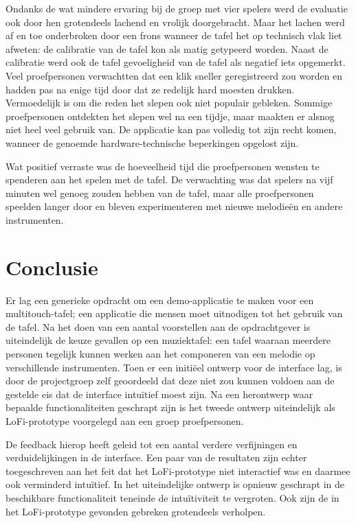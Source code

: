 \documentclass{acm}
\begin{document}
Ondanks de wat mindere ervaring bij de groep met vier spelers werd de evaluatie ook door hen grotendeels lachend en vrolijk doorgebracht. Maar het lachen werd af en toe onderbroken door een frons wanneer de tafel het op technisch vlak liet afweten: de calibratie van de tafel kon als matig getypeerd worden. Naast de calibratie werd ook de tafel gevoeligheid van de tafel als negatief iets opgemerkt. Veel proefpersonen verwachtten dat een klik sneller geregistreerd zou worden en hadden pas na enige tijd door dat ze redelijk hard moesten drukken. Vermoedelijk is om die reden het slepen ook niet populair gebleken. Sommige proefpersonen ontdekten het slepen wel na een tijdje, maar maakten er alsnog niet heel veel gebruik van. De applicatie kan pas volledig tot zijn recht komen, wanneer de genoemde hardware-technische beperkingen opgelost zijn.

Wat positief verraste was de hoeveelheid tijd die proefpersonen wensten te spenderen aan het spelen met de tafel. De verwachting was dat spelers na vijf minuten wel genoeg zouden hebben van de tafel, maar alle proefpersonen speelden langer door en bleven experimenteren met nieuwe melodieën en andere instrumenten.


\section{Conclusie}
\label{sec_conclusie}
Er lag een generieke opdracht om een demo-applicatie te maken voor een multitouch-tafel; een applicatie die mensen moet uitnodigen tot het gebruik van de tafel. Na het doen van een aantal voorstellen aan de opdrachtgever is uiteindelijk de keuze gevallen op een muziektafel: een tafel waaraan meerdere personen tegelijk kunnen werken aan het componeren van een melodie op verschillende instrumenten. Toen er een initiëel ontwerp voor de interface lag, is door de projectgroep zelf geoordeeld dat deze niet zou kunnen voldoen aan de gestelde eis dat de interface intuïtief moest zijn. Na een herontwerp waar bepaalde functionaliteiten geschrapt zijn is het tweede ontwerp uiteindelijk als LoFi-prototype voorgelegd aan een groep proefpersonen.

De feedback hierop heeft geleid tot een aantal verdere verfijningen en verduidelijkingen in de interface. Een paar van de resultaten zijn echter toegeschreven aan het feit dat het LoFi-prototype niet interactief was en daarmee ook verminderd intuïtief. In het uiteindelijke ontwerp is opnieuw geschrapt in de beschikbare functionaliteit teneinde de intuïtiviteit te vergroten. Ook zijn de in het LoFi-prototype gevonden gebreken grotendeels verholpen.
\end{document}
